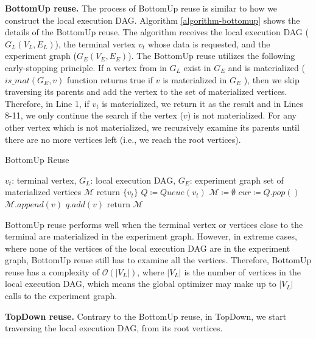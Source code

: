 \textbf{BottomUp reuse.}
The process of BottomUp reuse is similar to how we construct the local execution DAG.
Algorithm \ref{algorithm-bottomup} shows the details of the BottomUp reuse.
The algorithm receives the local execution DAG ($G_L(V_L, E_L)$), the terminal vertex $v_t$ whose data is requested, and the experiment graph ($G_E(V_E, E_E)$).
The BottomUp reuse utilizes the following early-stopping principle. 
If a vertex from in $G_L$ exist in $G_E$ and is materialized ($is\_mat(G_E, v)$ function returns true if $v$ is materialized in $G_E$ ), then we skip traversing its parents and add the vertex to the set of materialized vertices.
Therefore, in Line 1, if $v_t$ is materialized, we return it as the result and in Lines 8-11, we only continue the search if the vertex ($v$) is not materialized.
For any other vertex which is not materialized, we recursively examine its parents until there are no more vertices left (i.e., we reach the root vertices).

\begin{algorithm}[h]
\caption{BottomUp Reuse}\label{algorithm-bottomup}
\begin{algorithmic}[1]
\Require $v_t$: terminal vertex, $G_L$: local execution DAG, $G_E$: experiment graph
\Ensure set of materialized vertices $\mathcal{M}$ 
	\State return $\{v_t\}$
\EndIf
\State $Q \coloneqq  Queue(v_t)$  
\State $\mathcal{M} \coloneqq \emptyset$
	\State $cur  \coloneqq  Q.pop()$
			\State	$\mathcal{M}.append(v)$
		\Else
			\State $q.add(v)$
		\EndIf
	\EndFor
\EndWhile
\State return $\mathcal{M}$
\end{algorithmic}
\end{algorithm}
BottomUp reuse performs well when the terminal vertex or vertices close to the terminal are materialized in the experiment graph.
However, in extreme cases, where none of the vertices of the local execution DAG are in the experiment graph, BottomUp reuse still has to examine all the vertices.
Therefore, BottomUp reuse has a complexity of $\mathcal{O}(|V_L|)$, where $|V_L|$ is the number of vertices in the local execution DAG, which means the global optimizer may make up to $|V_L|$ calls to the experiment graph.

\textbf{TopDown reuse.}
Contrary to the BottomUp reuse, in TopDown, we start traversing the local execution DAG, from its root vertices.

